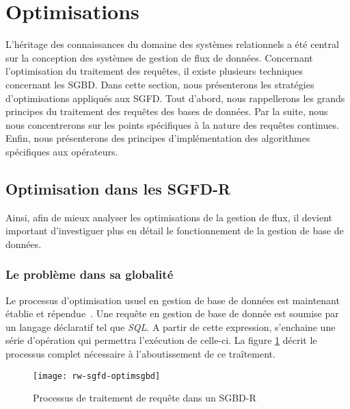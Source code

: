 \section{Optimisations}\label{sec:rw:sgfd:optim}
L'héritage des connaissances du domaine des systèmes relationnels a été central sur la conception des systèmes de gestion de flux de données. Concernant l'optimisation du traitement des requêtes, il existe plusieurs techniques concernant les SGBD. Dans cette section, nous présenterons les stratégies d'optimisations appliqués aux SGFD. Tout d'abord, nous rappellerons les grands principes du traitement des requêtes des bases de données. Par la suite, nous nous concentrerons sur les points spécifiques à la nature des requêtes continues. Enfin, nous présenterons des principes d'implémentation des algorithmes spécifiques aux opérateurs.

\subsection{Optimisation dans les SGFD-R}
Ainsi, afin de mieux analyser les optimisations de la gestion de flux, il devient important d'investiguer plus en détail le fonctionnement de la gestion de base de données.

\subsubsection{Le problème dans sa globalité}
Le processus d'optimisation usuel en gestion de base de données est maintenant établie et répendue~\cite{Ioannidis:optimization}. Une requête en gestion de base de donnée est soumise par un langage déclaratif tel que \textit{SQL}. A partir de cette expression, s'enchaine une série d'opération qui permettra l'exécution de celle-ci. La figure \ref{fig:rw:sgfd:optim:processus} décrit le processus complet nécessaire à l'aboutissement de ce traîtement. 
\begin{figure}[h]
\centering
\texttt{[image: rw-sgfd-optimsgbd]}
\caption{Processus de traitement de requête dans un SGBD-R}\label{fig:rw:sgfd:optim:processus}
\end{figure}

